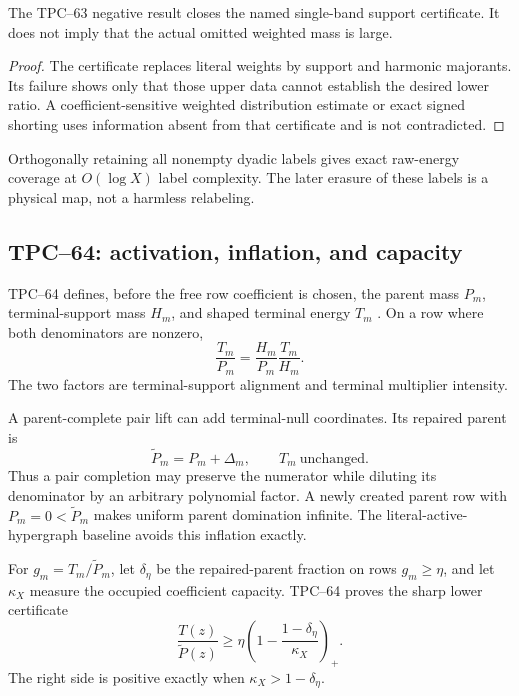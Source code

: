 \begin{proposition}
\label{prop:tpc63-no-go-scope}
The TPC--63 negative result closes the named single-band support certificate.
It does not imply that the actual omitted weighted mass is large.
\end{proposition}

\begin{proof}
The certificate replaces literal weights by support and harmonic
majorants.  Its failure shows only that those upper data cannot establish
the desired lower ratio.  A coefficient-sensitive weighted distribution
estimate or exact signed shorting uses information absent from that
certificate and is not contradicted.
\end{proof}

Orthogonally retaining all nonempty dyadic labels gives exact raw-energy
coverage at \(O(\log X)\) label complexity.  The later erasure of these
labels is a physical map, not a harmless relabeling.

\subsection{TPC--64: activation, inflation, and capacity}

TPC--64 defines, before the free row coefficient is chosen, the parent mass
\(P_m\), terminal-support mass \(H_m\), and shaped terminal energy \(T_m\)
\citep{WangTPC64}.  On a row where both denominators are nonzero,
\begin{equation}
 \frac{T_m}{P_m}
 =
 \frac{H_m}{P_m}\frac{T_m}{H_m}.
 \label{eq:tpc72-activation-factorization}
\end{equation}
The two factors are terminal-support alignment and terminal multiplier
intensity.

A parent-complete pair lift can add terminal-null coordinates.  Its repaired
parent is
\begin{equation}
 \widetilde P_m=P_m+\Delta_m,
 \qquad
 T_m\ \text{unchanged}.
 \label{eq:tpc72-parent-inflation}
\end{equation}
Thus a pair completion may preserve the numerator while diluting its
denominator by an arbitrary polynomial factor.  A newly created parent row
with \(P_m=0<\widetilde P_m\) makes uniform parent domination infinite.  The
literal-active-hypergraph baseline avoids this inflation exactly.

For \(g_m=T_m/\widetilde P_m\), let \(\delta_\eta\) be the repaired-parent
fraction on rows \(g_m\ge\eta\), and let \(\kappa_X\) measure the occupied
coefficient capacity.  TPC--64 proves the sharp lower certificate
\begin{equation}
 \frac{T(z)}{\widetilde P(z)}
 \ge
 \eta\left(1-\frac{1-\delta_\eta}{\kappa_X}\right)_+.
 \label{eq:tpc72-capacity-certificate}
\end{equation}
The right side is positive exactly when
\(\kappa_X>1-\delta_\eta\).

